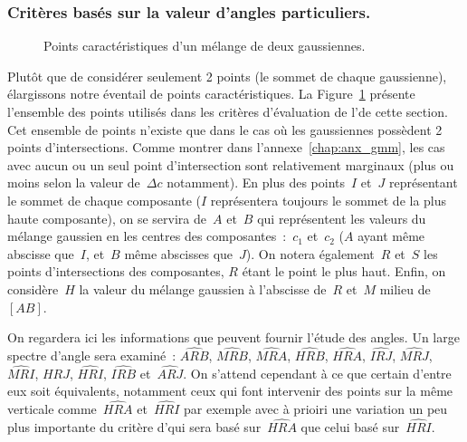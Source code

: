 \documentclass[main.tex]{subfiles}
\begin{document}
\subsubsection{Critères basés sur la valeur d'angles particuliers.}
\begin{figure}
\centering
{}\quad
{}
\caption{\label{fig:pts_carac_intersection_gaussienne}Points caractéristiques d'un mélange de deux gaussiennes.}
\end{figure}

Plutôt que de considérer seulement 2 points (le sommet de chaque gaussienne), élargissons notre éventail de points caractéristiques. La Figure~\ref{fig:pts_carac_intersection_gaussienne} présente l'ensemble des points utilisés dans les critères d'évaluation de l'\hetero de cette section. Cet ensemble de points n'existe que dans le cas où les gaussiennes possèdent 2 points d'intersections. Comme montrer dans l'annexe~\ref{chap:anx_gmm}, les cas avec aucun ou un seul point d'intersection sont relativement marginaux (plus ou moins selon la valeur de~$\Delta c$ notamment). En plus des points~$I$ et~$J$ représentant le sommet de chaque composante ($I$ représentera toujours le sommet de la plus haute composante), on se servira de~$A$ et~$B$ qui représentent les valeurs du mélange gaussien en les centres des composantes~:~$c_1$ et~$c_2$ ($A$ ayant même abscisse que~$I$, et~$B$ même abscisses que~$J$). On notera également~$R$ et~$S$ les points d'intersections des composantes, $R$ étant le point le plus haut. Enfin, on considère~$H$ la valeur du mélange gaussien à l'abscisse de~$R$ et~$M$ milieu de~$[AB]$. 


On regardera ici les informations que peuvent fournir l'étude des angles. Un large spectre d'angle sera examiné~: $\widehat{ARB}$, $\widehat{MRB}$, $\widehat{MRA}$,  $\widehat{HRB}$, $\widehat{HRA}$, $\widehat{IRJ}$, $\widehat{MRJ}$, $\widehat{MRI}$, $\widehat{HRJ}$, $\widehat{HRI}$, $\widehat{IRB}$ et~$\widehat{ARJ}$. 
On s'attend cependant à ce que certain d'entre eux soit équivalents, notamment ceux qui font intervenir des points sur la même verticale comme~$\widehat{HRA}$ et~$\widehat{HRI}$ par exemple avec à prioiri une variation un peu plus importante du critère d'\hetero qui sera basé sur~$\widehat{HRA}$ que celui basé sur~$\widehat{HRI}$.
\end{document}
